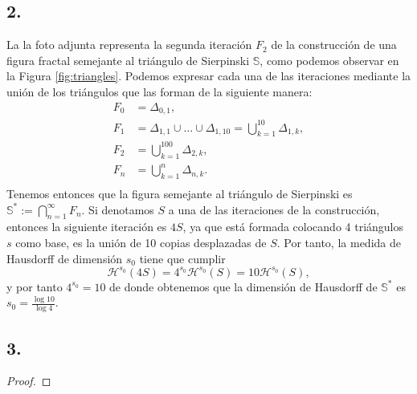 \documentclass[11pt,a4paper]{article}
\begin{document}
\newpage
\subsection*{2.}


La la foto adjunta representa la segunda iteración $ F_2 $ de la construcción de una figura fractal semejante al triángulo de Sierpinski $ \mathbb S $, como podemos observar en la Figura \ref{fig:triangles}. Podemos expresar cada una de las iteraciones mediante la unión de los triángulos que las forman de la siguiente manera:
\begin{align*}
  F_0 &= \Delta_{0,1}, \\ 
  F_1 &= \Delta_{1,1} \cup \dots \cup \Delta_{1,10} = \bigcup_{k=1}^{10} \Delta_{1, k}, \\
  F_2 &= \bigcup_{k=1}^{100} \Delta_{2, k}, \\
  F_n &= \bigcup_{k=1}^{n} \Delta_{n, k}. \\
\end{align*}
Tenemos entonces que la figura semejante al triángulo de Sierpinski es $ \mathbb S^* := \bigcap_{n=1}^\infty F_n $. Si denotamos $ S $ a una de las iteraciones de la construcción, entonces la siguiente iteración es $ 4S $, ya que está formada colocando 4 triángulos $ s $ como base, es la unión de 10 copias desplazadas de $ S $. Por tanto, la medida de Hausdorff de dimensión $ s_0 $ tiene que cumplir
$$
  \mathcal H^{s_0} (4S) = 4^{s_0} \mathcal H^{s_0} (S) = 10 \mathcal H^{s_0} (S),
$$
y por tanto $ 4^{s_0} = 10 $ de donde obtenemos que la dimensión de Hausdorff de $ \mathbb S^* $ es $ s_0 = \frac{\log 10}{\log 4} $.

\subsection*{3.}
\begin{proof}
  
\end{proof}
\end{document}
